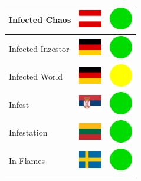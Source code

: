 \documentclass[12pt, a4paper, twoside]{report}
\begin{document}
\begin{center}
\begin{longtable}{|p{5cm}|p{2cm}|p{2cm}|}
 Infected Chaos                                             & \includegraphics[width=1cm]{../img/flags/at} &   \includegraphics[width=1cm]{../likes/y} \\ \hline
 Infected Inzestor                                          & \includegraphics[width=1cm]{../img/flags/de} &   \includegraphics[width=1cm]{../likes/y} \\ \hline
 Infected World                                             & \includegraphics[width=1cm]{../img/flags/de} &   \includegraphics[width=1cm]{../likes/m} \\ \hline
 Infest                                                     & \includegraphics[width=1cm]{../img/flags/rs} &   \includegraphics[width=1cm]{../likes/y} \\ \hline
 Infestation                                                & \includegraphics[width=1cm]{../img/flags/lt} &   \includegraphics[width=1cm]{../likes/y} \\ \hline
 In Flames                                                  & \includegraphics[width=1cm]{../img/flags/se} &   \includegraphics[width=1cm]{../likes/y} \\ \hline

\end{longtable}
\end{center}
\end{document}
